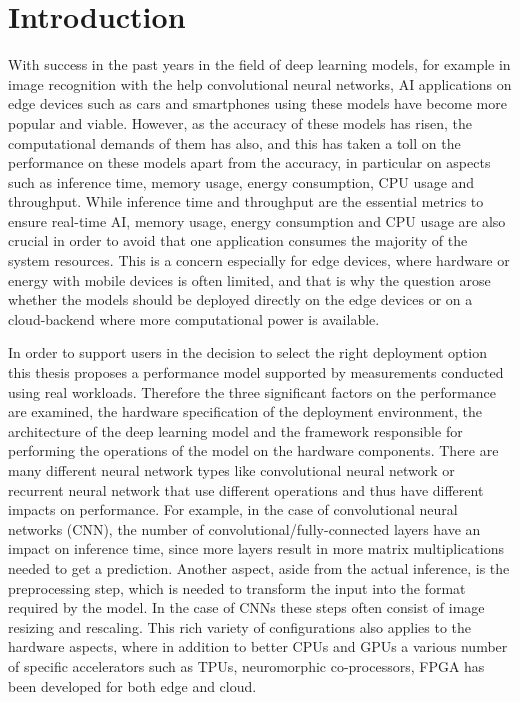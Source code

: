 \chapter{Introduction}



With success in the past years in the field of deep learning models, for example in image recognition with the help convolutional neural networks, AI applications on edge devices such as cars and smartphones using these models have become more popular and viable.
However, as the accuracy of these models has risen, the computational demands of them has also, and this has taken a toll on the performance on these models apart from the accuracy, in particular on aspects such as inference time, memory usage, energy consumption, CPU usage and throughput. 
While inference time and throughput are the essential metrics to ensure real-time AI, memory usage, energy consumption and CPU usage are also crucial in order to avoid that one application consumes the majority of the system resources.
This is a concern especially for edge devices, where hardware or energy with mobile devices is often limited, and that is why the question arose whether the models should be deployed directly on the edge devices or on a cloud-backend where more computational power is available. 

In order to support users in the decision to select the right deployment option this thesis proposes a performance model supported by measurements conducted using real workloads.
Therefore the three significant factors on the performance are examined, the hardware specification of the deployment environment, the architecture of the deep learning model and the framework responsible for performing the operations of the model on the hardware components.
There are many different neural network types like convolutional neural network or recurrent neural network that use different operations and thus have different impacts on performance.
For example, in the case of convolutional neural networks (CNN), the number of convolutional/fully-connected layers have an impact on inference time, since more layers result in more matrix multiplications needed to get a prediction.
Another aspect, aside from the actual inference, is the preprocessing step, which is needed to transform the input into the format required by the model. In the case of CNNs these steps often consist of image resizing and rescaling.
This rich variety of configurations also applies to the hardware aspects, where in addition to better CPUs and GPUs a various number of specific accelerators such as TPUs, neuromorphic co-processors, FPGA has been developed for both edge and cloud.



